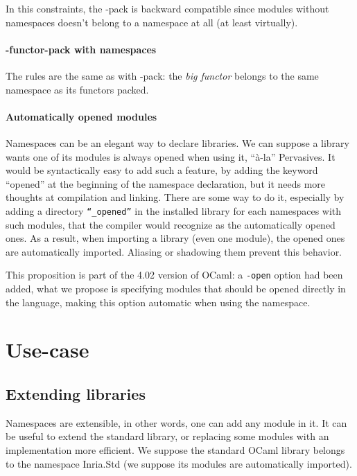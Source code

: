 \documentclass[11pt,a4paper]{article}
\begin{document}
In this constraints, the -pack is backward compatible since modules without
namespaces doesn't belong to a namespace at all (at least virtually).

\paragraph{-functor-pack with namespaces}

The rules are the same as with -pack: the \emph{big functor} belongs to the same
namespace as its functors packed.

\paragraph{Automatically opened modules}

Namespaces can be an elegant way to declare libraries. We can suppose a library
wants one of its modules is always opened when using it, ``à-la'' Pervasives. It
would be syntactically easy to add such a feature, by adding the keyword
``opened'' at the beginning of the namespace declaration, but it needs more
thoughts at compilation and linking. There are some way to do it, especially by
adding a directory \texttt{``\_opened''} in the installed library for each
namespaces with such modules, that the compiler would recognize as the
automatically opened ones. As a result, when importing a library (even one
module), the opened ones are automatically imported. Aliasing or shadowing
them prevent this behavior.

This proposition is part of the 4.02 version of OCaml: a \texttt{-open} option
had been added, what we propose is specifying modules that should be opened
directly in the language, making this option automatic when using the namespace.

\section{Use-case}

\subsection{Extending libraries}

Namespaces are extensible, in other words, one can add any module in it. It can
be useful to extend the standard library, or replacing some modules with an
implementation more efficient. We suppose the standard OCaml library belongs to
the namespace Inria.Std (we suppose its modules are automatically
imported).
\end{document}

